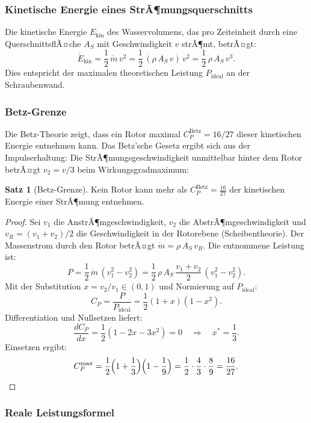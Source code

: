 ﻿\documentclass[a4paper,12pt]{article}
\theoremstyle{definition}
\newtheorem{satz}{Satz}
\begin{document}
\subsubsection{Kinetische Energie eines StrÃ¶mungsquerschnitts}

Die kinetische Energie $E_{\mathrm{kin}}$ des Wasservolumens, das pro Zeiteinheit durch
eine QuerschnittsflÃ¤che $A_S$ mit Geschwindigkeit $v$ strÃ¶mt, betrÃ¤gt:
\[
  \dot{E}_{\mathrm{kin}} = \frac{1}{2}\,\dot{m}\,v^2 = \frac{1}{2}\,(\rho\,A_S\,v)\,v^2
  = \frac{1}{2}\,\rho\,A_S\,v^3.
\]
Dies entspricht der maximalen theoretischen Leistung $P_{\mathrm{ideal}}$ an der Schraubenwand.

\subsubsection{Betz-Grenze}

Die Betz-Theorie zeigt, dass ein Rotor maximal $C_P^{\mathrm{Betz}} = 16/27$ dieser
kinetischen Energie entnehmen kann. Das Betz'sche Gesetz ergibt sich aus der
Impulserhaltung: Die StrÃ¶mungsgeschwindigkeit unmittelbar hinter dem Rotor betrÃ¤gt
$v_2 = v/3$ beim Wirkungsgradmaximum:

\begin{satz}[Betz-Grenze]
\label{satz:betz}
Kein Rotor kann mehr als $C_P^{\mathrm{Betz}} = \frac{16}{27}$ der kinetischen Energie
einer StrÃ¶mung entnehmen.
\end{satz}

\begin{proof}
Sei $v_1$ die AnstrÃ¶mgeschwindigkeit, $v_2$ die AbstrÃ¶mgeschwindigkeit und $v_R =
(v_1 + v_2)/2$ die Geschwindigkeit in der Rotorebene (Scheibentheorie). Der
Massenstrom durch den Rotor betrÃ¤gt $\dot{m} = \rho\,A_S\,v_R$. Die entnommene
Leistung ist:
\[
  P = \frac{1}{2}\,\dot{m}\,(v_1^2 - v_2^2)
    = \frac{1}{2}\,\rho\,A_S\,\frac{v_1+v_2}{2}\,(v_1^2-v_2^2).
\]
Mit der Substitution $x = v_2/v_1 \in (0, 1)$ und Normierung auf $P_{\mathrm{ideal}}$:
\[
  C_P = \frac{P}{P_{\mathrm{ideal}}} = \frac{1}{2}(1+x)(1-x^2).
\]
Differentiation und Nullsetzen liefert:
\[
  \frac{dC_P}{dx} = \frac{1}{2}(1 - 2x - 3x^2) = 0 \quad\Rightarrow\quad x^* = \frac{1}{3}.
\]
Einsetzen ergibt:
\[
  C_P^{\max} = \frac{1}{2}\Bigl(1+\frac{1}{3}\Bigr)\Bigl(1-\frac{1}{9}\Bigr)
             = \frac{1}{2} \cdot \frac{4}{3} \cdot \frac{8}{9} = \frac{16}{27}. \qedhere
\]
\end{proof}

\subsubsection{Reale Leistungsformel}
\end{document}
